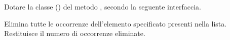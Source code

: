 Dotare la classe  () del metodo , secondo la seguente interfaccia.

\begin{methodslist}

 {
Elimina tutte le occorrenze dell'elemento specificato presenti nella lista. Restituisce il numero di occorrenze eliminate.
}

\end{methodslist}